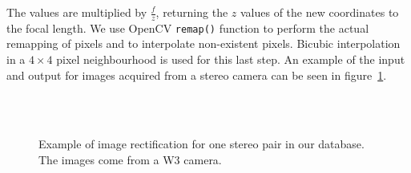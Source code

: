 The values are multiplied by $\frac{f}{z}$, returning the $z$ values of the new coordinates to the focal length. We use OpenCV \texttt{remap()} function to perform the actual remapping of pixels and to
interpolate non-existent pixels. Bicubic interpolation in a $4\times4$ pixel neighbourhood
is used for this last step. An example of the input and output for images acquired from a stereo camera can be seen in figure~\ref{fig:ex-rectification}.

\begin{figure}[ht]
 \centering
 \\
 \\
 \caption[Example of image rectification]{Example of image rectification for one stereo pair in our database. The images come from a W3 camera.}
 \label{fig:ex-rectification}
\end{figure}

